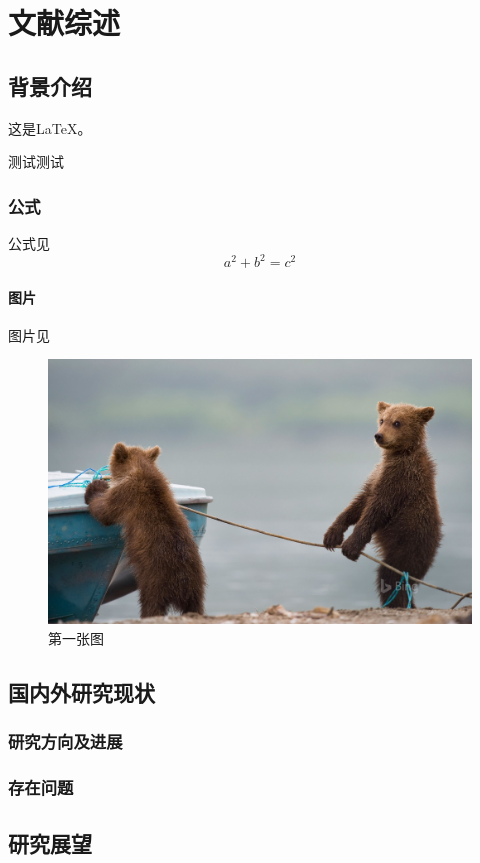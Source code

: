 \pagestyle{Content}\zhengwen
\section{文献综述}
	 	
\subsection{背景介绍}
这是\LaTeX。
		
\noindent 测试测试
	
\subsubsection{公式}
公式见
\begin{equation}
\label{eq:1}
a^2 + b^2 = c^2
\end{equation}
	
\paragraph{图片}

图片见

\vspace{10ex}
\begin{figure}[H]
	\includegraphics[width=\textwidth]{images/BingWallpaper-2019-04-01.jpg}
	\caption{第一张图}\label{Wallpaper}
\end{figure}
	
\subsection{国内外研究现状}
	
\subsubsection{研究方向及进展}
	
\subsubsection{存在问题}
	
\subsection{研究展望}